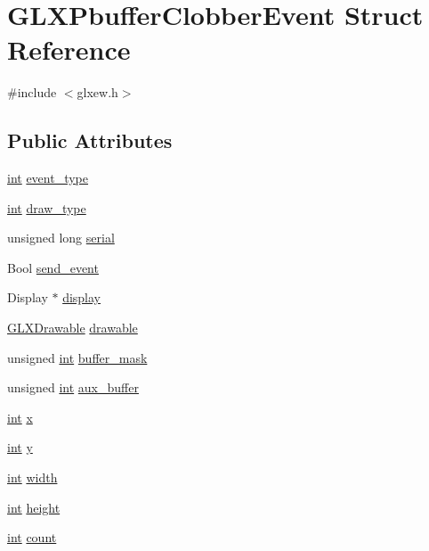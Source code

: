 \hypertarget{struct_g_l_x_pbuffer_clobber_event}{\section{G\-L\-X\-Pbuffer\-Clobber\-Event Struct Reference}
\label{struct_g_l_x_pbuffer_clobber_event}
}


{\ttfamily \#include $<$glxew.\-h$>$}

\subsection*{Public Attributes}
\begin{DoxyCompactItemize}
\item 
\hyperlink{wglew_8h_a500a82aecba06f4550f6849b8099ca21}{int} \hyperlink{struct_g_l_x_pbuffer_clobber_event_a30d7162d8d77246b01f5e610cda4da68}{event\-\_\-type}
\item 
\hyperlink{wglew_8h_a500a82aecba06f4550f6849b8099ca21}{int} \hyperlink{struct_g_l_x_pbuffer_clobber_event_a243f92b79d3cfbde73eab02815be2320}{draw\-\_\-type}
\item 
unsigned long \hyperlink{struct_g_l_x_pbuffer_clobber_event_a6390b2875ae06a4cb827d2b4c321eda3}{serial}
\item 
Bool \hyperlink{struct_g_l_x_pbuffer_clobber_event_aa51969e67e4ad6095bda26ca64fe8ba6}{send\-\_\-event}
\item 
Display $\ast$ \hyperlink{struct_g_l_x_pbuffer_clobber_event_aeb49bb93cc59448e75d66170a39596d1}{display}
\item 
\hyperlink{glxew_8h_a826f51745d9d6c81bdbac47ae2b80cf7}{G\-L\-X\-Drawable} \hyperlink{struct_g_l_x_pbuffer_clobber_event_a388908b766e35205c1a461ea8b60439f}{drawable}
\item 
unsigned \hyperlink{wglew_8h_a500a82aecba06f4550f6849b8099ca21}{int} \hyperlink{struct_g_l_x_pbuffer_clobber_event_aff4c23d00f6dad98427f8d32a5f10580}{buffer\-\_\-mask}
\item 
unsigned \hyperlink{wglew_8h_a500a82aecba06f4550f6849b8099ca21}{int} \hyperlink{struct_g_l_x_pbuffer_clobber_event_a13193b6e7e3e52b15f754fe91403b7ec}{aux\-\_\-buffer}
\item 
\hyperlink{wglew_8h_a500a82aecba06f4550f6849b8099ca21}{int} \hyperlink{struct_g_l_x_pbuffer_clobber_event_a8f0a7162a033c89ee94ce535580dbc32}{x}
\item 
\hyperlink{wglew_8h_a500a82aecba06f4550f6849b8099ca21}{int} \hyperlink{struct_g_l_x_pbuffer_clobber_event_a69eb7ac60d36ac3ec4550ac206cfc61f}{y}
\item 
\hyperlink{wglew_8h_a500a82aecba06f4550f6849b8099ca21}{int} \hyperlink{struct_g_l_x_pbuffer_clobber_event_aaca375fecb872c73c60cd5d0bfc7c7a5}{width}
\item 
\hyperlink{wglew_8h_a500a82aecba06f4550f6849b8099ca21}{int} \hyperlink{struct_g_l_x_pbuffer_clobber_event_aed4e539c896bdad15217bf92c28f8520}{height}
\item 
\hyperlink{wglew_8h_a500a82aecba06f4550f6849b8099ca21}{int} \hyperlink{struct_g_l_x_pbuffer_clobber_event_a61e9f6b31738464dca67f909fcacd298}{count}
\end{DoxyCompactItemize}


